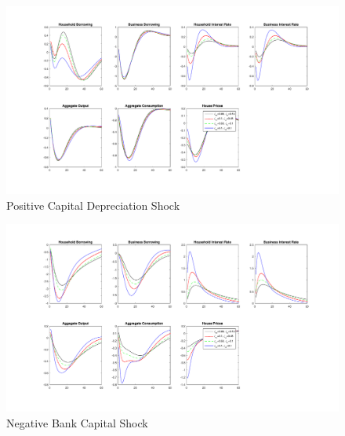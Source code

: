 \documentclass[12pt]{article}
\numberwithin{equation}{section}
\begin{document}



\begin{figure}[H]
\centering
\caption{Positive Capital Depreciation Shock}
\includegraphics[scale=0.5]{stickinessHk.pdf}
\end{figure}

\begin{figure}[H]
\centering
\caption{Negative Bank Capital Shock}
\includegraphics[scale=0.5]{stickinessCAB.pdf}
\end{figure}
\end{document}

